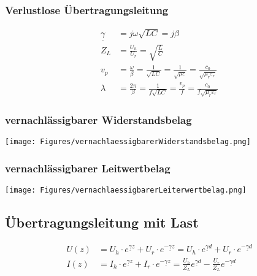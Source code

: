 \subsubsection{Verlustlose Übertragungsleitung}
\begin{align*}
    \underline{\gamma} & = j\omega\sqrt{LC}= j\beta                                                                                           \\
    Z_L                & =\frac{U_h}{U_r}       = \sqrt{\frac{L}{C}}                                                                          \\
    v_p                & = \frac{\omega}{\beta} = \frac{1}{\sqrt{LC}}= \frac{1}{\sqrt{\mu\varepsilon}}= \frac{c_0}{\sqrt{\mu_r\varepsilon_r}} \\
    \lambda            & = \frac{2\pi}{\beta}=\frac{1}{f\sqrt{LC}}= \frac{v_p}{f}= \frac{c_0}{f\sqrt{\mu_r\varepsilon_r}}
\end{align*}

\subsubsection{vernachlässigbarer Widerstandsbelag}
\texttt{[image: Figures/vernachlaessigbarerWiderstandsbelag.png]}


\subsubsection{vernachlässigbarer Leitwertbelag}
\texttt{[image: Figures/vernachlaessigbarerLeiterwertbelag.png]}

\subsection{Übertragungsleitung mit Last}

\begin{align*}
    U(z) & = U_h\cdot  e^{\underline{\gamma} z} + U_r\cdot  e^{-\underline{\gamma} z} = U_h\cdot  e^{\underline{\gamma} d} + U_r\cdot  e^{-\underline{\gamma} d}           \\
    I(z) & = I_h\cdot  e^{\underline{\gamma} z} + I_r\cdot  e^{-\underline{\gamma} z} = \frac{U_h}{Z_L}e^{\underline{\gamma} d} - \frac{U_r}{Z_L}e^{-\underline{\gamma} d}
\end{align*}

